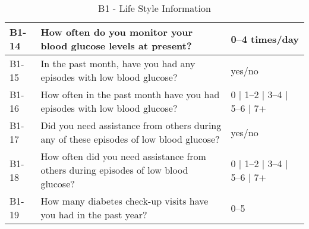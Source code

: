 \begin{table}[H]
\begin{tabularx}{\textwidth}{|l|X|l|}
        B1-14 & How often do you monitor your blood glucose levels at present? & 0--4 times/day \\ \hline
        B1-15 & In the past month, have you had any episodes with low blood glucose? & yes/no \\ \hline
        B1-16 & How often in the past month have you had episodes with low blood glucose? & 0 $\mid$ 1--2 $\mid$ 3--4 $\mid$ 5--6 $\mid$ 7+ \\ \hline
        B1-17 & Did you need assistance from others during any of these episodes of low blood glucose? & yes/no \\ \hline
        B1-18 & How often did you need assistance from others during episodes of low blood glucose? & 0 $\mid$ 1--2 $\mid$ 3--4 $\mid$ 5--6 $\mid$ 7+ \\ \hline
        B1-19 & How many diabetes check-up visits have you had in the past year? & 0--5 \\ \hline
    \end{tabularx}
    \caption{B1 - Life Style Information}
    \label{tab:Life-Style-Information}
\end{table}


